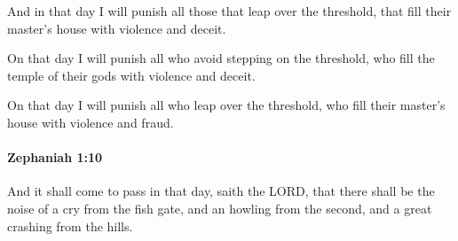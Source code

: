 			\begin{versebox}
					\item[BHS] 
					\item[LXX] 
					\item[ASV] And in that day I will punish all those that leap over the threshold, that fill their master's house with violence and deceit.
					\item[NIV] On that day I will punish all who avoid stepping on the threshold, who fill the temple of their gods with violence and deceit.
					\item[NRSV] On that day I will punish all who leap over the threshold, who fill their master’s house with violence and fraud.
			\end{versebox}

		\paragraph{Zephaniah 1:10} %
			\label{ZEPHANIAH-1-10}

			And it shall come to pass in that day, saith the LORD, that there shall be the noise of a cry from the fish gate, and an howling from the second, and a great crashing from the hills.

